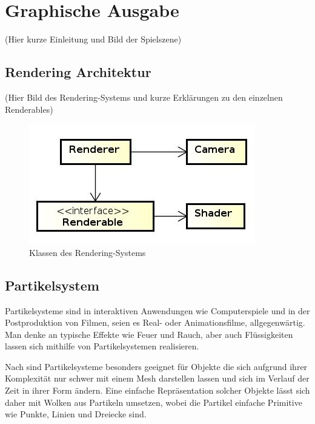 
\chapter{Graphische Ausgabe}
\label{Kapitel 2}
%
(Hier kurze Einleitung und Bild der Spielszene)


\section{Rendering Architektur}
\label{Kapitel_2_-_Unterkapitel_1}
%
(Hier Bild des Rendering-Systems und kurze Erklärungen zu den einzelnen Renderables)
\begin{figure}[h]
	\centering
	\includegraphics[width=0.6\linewidth]{bilder/RenderingSystem}
	\caption{Klassen des Rendering-Systems}
\label{fig:renderingSystem}
\end{figure}

\section{Partikelsystem}
\label{Kapitel_2_-_Unterkapitel_2}
%
Partikelsysteme sind in interaktiven Anwendungen wie Computerspiele und in der Postproduktion von Filmen, seien es Real- oder Animationsfilme, allgegenwärtig.
Man denke an typische Effekte wie Feuer und Rauch, aber auch Flüssigkeiten lassen sich mithilfe von Partikelsystemen realisieren.

Nach \cite{reeves:particle_systems} sind Partikelsysteme besonders geeignet für Objekte die sich aufgrund ihrer Komplexität nur schwer mit einem Mesh darstellen lassen und sich im Verlauf der Zeit in ihrer Form ändern. Eine einfache Repräsentation solcher Objekte lässt sich daher mit Wolken aus Partikeln umsetzen, wobei die Partikel einfache Primitive wie Punkte, Linien und Dreiecke sind\cite{reeves:particle_systems}.

